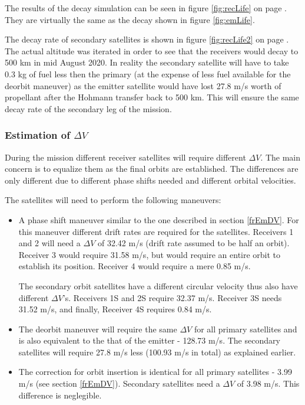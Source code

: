 The results of the decay simulation can be seen in figure \ref{fig:recLife} on page \pageref{fig:recLife}. They are virtually the same as the decay shown in figure \ref{fig:emLife}.

The decay rate of secondary satellites is shown in figure \ref{fig:recLife2} on page \pageref{fig:recLife2}. The actual altitude was iterated in order to see that the receivers would decay to 500 km in mid August 2020. In reality the secondary satellite will have to take 0.3 kg of fuel less then the primary (at the expense of less fuel available for the deorbit maneuver) as the emitter satellite would have lost 27.8 m/s worth of propellant after the Hohmann transfer back to 500 km. This will ensure the same decay rate of the secondary leg of the mission.    


\subsubsection{Estimation of $\Delta V$}
\label{frRecDV}

During the mission different receiver satellites will require different $\Delta V$. The main concern is to equalize them as the final orbits are established. The differences are only different due to different phase shifts needed and different orbital velocities.

The satellites will need to perform the following maneuvers:

\begin{itemize}
	\item A phase shift maneuver similar to the one described in section \ref{frEmDV}. For this maneuver different drift rates are required for the satellites. Receivers 1 and 2 will need a $\Delta V$ of 32.42 m/s (drift rate assumed to be half an orbit). Receiver 3 would require 31.58 m/s, but would require an entire orbit to establish its position. Receiver 4 would require a mere 0.85 m/s.
	
	The secondary orbit satellites have a different circular velocity thus also have different $\Delta V$'s. Receivers 1S and 2S require 32.37 m/s. Receiver 3S needs 31.52 m/s, and finally, Receiver 4S requires 0.84 m/s.
	\item The deorbit maneuver will require the same $\Delta V$ for all primary satellites and is also equivalent to the that of the emitter - 128.73 m/s. The secondary satellites will require 27.8 m/s less (100.93 m/s in total) as explained earlier.
	\item The correction for orbit insertion is identical for all primary satellites - 3.99 m/s (see section \ref{frEmDV}). Secondary satellites need a $\Delta V$ of 3.98 m/s. This difference is neglegible.  
\end{itemize}

